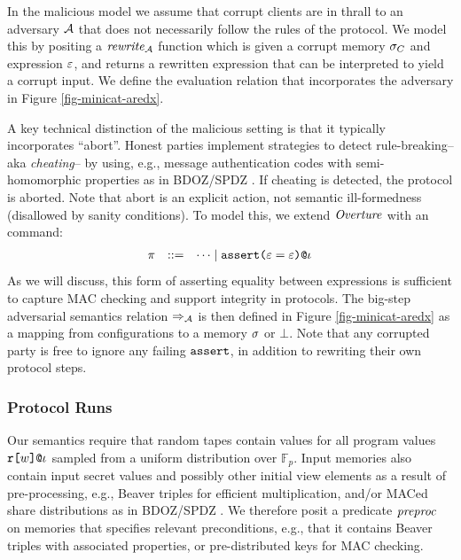 \minicataredxfig

In the malicious model we assume that corrupt clients are in
thrall to an adversary $\mathcal{A}$ that does not necessarily follow
the rules of the protocol.  We model this by positing a $\mathit{rewrite}_{\mathcal{A}}$
function which is given a corrupt memory $\sigma_C$ and expression
$\varepsilon$, and returns a rewritten expression that can be interpreted to
yield a corrupt input. We define the evaluation relation that
incorporates the adversary in Figure \ref{fig-minicat-aredx}.

A key technical distinction of the malicious setting is that it
typically incorporates ``abort''. Honest parties implement strategies
to detect rule-breaking-- aka \emph{cheating}-- by using, e.g.,
message authentication codes with semi-homomorphic properties as in
BDOZ/SPDZ \cite{10.1007/978-3-030-68869-1_3}. If cheating is detected,
the protocol is aborted. Note that abort is an explicit action, not
semantic ill-formedness (disallowed by sanity conditions). To model
this, we extend $\mathit{Overture}$ with an  command:
$$
    \begin{array}{rcl@{\hspace{2mm}}r}
      \prog &::=& \cdots \mid \elab{\assert{\be = \be}}{\cid}
    \end{array}
$$
As we will discuss, this form of asserting equality between expressions
is sufficient to capture MAC checking and support integrity in protocols.
The big-step adversarial semantics relation $\Rightarrow_{\mathcal{A}}$ is then defined
in Figure \ref{fig-minicat-aredx} as a mapping from configurations to
a memory $\sigma$ or $\bot$. Note that any corrupted party is free to
ignore any failing $\texttt{assert}$, in addition to rewriting their
own protocol steps.

\subsubsection{Protocol Runs}

Our semantics require that random tapes contain values for all program
values $\texttt{r[}w\texttt{]}\texttt{@}\iota$ sampled from a uniform distribution
over $\mathbb{F}_p$. Input memories also contain input secret values
and possibly other initial view elements as a result of
pre-processing, e.g., Beaver triples for efficient multiplication,
and/or MACed share distributions as in BDOZ/SPDZ
\cite{evans2018pragmatic,10.1007/978-3-030-68869-1_3}. We therefore
posit a predicate $\mathit{preproc}$ on memories that specifies relevant
preconditions, e.g., that it contains Beaver triples with
associated properties, or pre-distributed keys for MAC checking.

